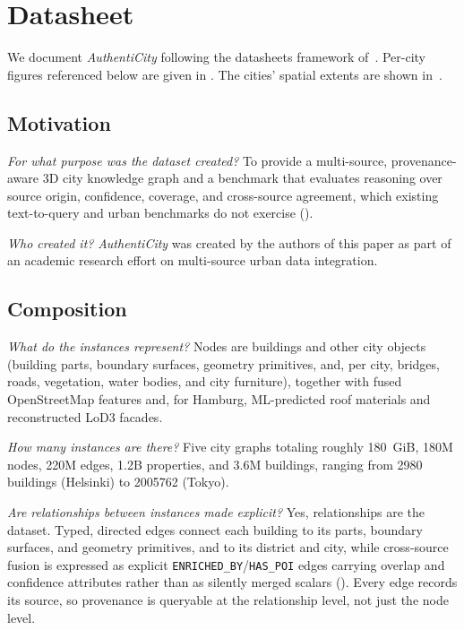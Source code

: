 \documentclass[sigconf,authordraft]{acmart}
\newcommand{\benchname}{\textit{Authenti\-City}}
\newcommand{\dsq}[1]{\par\smallskip\noindent\emph{#1}\space}
\begin{document}
\section{Datasheet}\label{app:datasheet}

We document \benchname{} following the datasheets framework of~\citet{gebru_datasheets_2021}. Per-city figures referenced below are given in . The cities' spatial extents are shown in~. 

\subsection{Motivation} 

\dsq{For what purpose was the dataset created?} To provide a multi-source, provenance-aware 3D city knowledge graph and a benchmark that evaluates reasoning over source origin, confidence, coverage, and cross-source agreement, which existing text-to-query and urban benchmarks do not exercise (). 

\dsq{Who created it?} \benchname{} was created by the authors of this paper as part of an academic research effort on multi-source urban data integration. 

\subsection{Composition}

\dsq{What do the instances represent?} Nodes are buildings and other city objects (building parts, boundary surfaces, geometry primitives, and, per city, bridges, roads, vegetation, water bodies, and city furniture), together with fused OpenStreetMap features and, for Hamburg, ML-predicted roof materials and reconstructed LoD3 facades.

\dsq{How many instances are there?} Five city graphs totaling roughly \num{180}~GiB, \num{180}M nodes, \num{220}M edges, \num{1.2}B properties, and \num{3.6}M buildings, ranging from \num{2980} buildings (Helsinki) to \num{2005762} (Tokyo).

\dsq{Are relationships between instances made explicit?} Yes, relationships are the dataset. Typed, directed edges connect each building to its parts, boundary surfaces, and geometry primitives, and to its district and city, while cross-source fusion is expressed as explicit \texttt{ENRICHED\_BY}/\texttt{HAS\_POI} edges carrying overlap and confidence attributes rather than as silently merged scalars (). Every edge records its source, so provenance is queryable at the relationship level, not just the node level.
\end{document}
